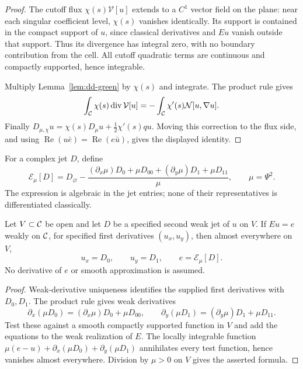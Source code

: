 \begin{proof}
\leanok
The cutoff flux $\chi(s)\mathcal V[u]$ extends to a $C^1$ vector field
on the plane: near each singular coefficient level, $\chi(s)$ vanishes
identically. Its support is contained in the compact support of $u$,
since classical derivatives and $Eu$ vanish outside that support.
Thus its divergence has integral zero, with no boundary contribution
from the cell. All cutoff quadratic terms are continuous and compactly
supported, hence integrable.

Multiply Lemma~\ref{lem:dd-green} by $\chi(s)$ and integrate. The product rule gives
\[
 \int_{\mathcal{C}}\chi(s)\operatorname{div}\mathcal V[u]
 =-\int_{\mathcal{C}}\chi'(s)\mathcal N[u,\nabla u].
\]
Finally
$D_{\mu,\chi}u=\chi(s)D_\mu u+\tfrac12\chi'(s)qu$.
Moving this correction to the flux side, and using
$\operatorname{Re}(u\bar e)=\operatorname{Re}(e\bar u)$,
gives the displayed identity.
\end{proof}

\begin{definition}
\label{def:dd-operator-jet}
\leanok
For a complex jet $D$, define
\[
 \mathcal E_\mu[D]
 =D_\varnothing-\frac{
   (\partial_x\mu)D_0+\mu D_{00}
   +(\partial_y\mu)D_1+\mu D_{11}}{\mu},
 \qquad \mu=\Psi^2.
\]
The expression is algebraic in the jet entries; none of their representatives
is differentiated classically.
\end{definition}

\begin{lemma}
\label{lem:dd-operator-jet}
\leanok
Let $V\subset\mathcal{C}$ be open and let $D$ be a specified second weak jet
of $u$ on $V$. If $Eu=e$ weakly on $\mathcal{C}$, for specified first
derivatives $(u_x,u_y)$, then almost everywhere on $V$,
\[
 u_x=D_0,\qquad u_y=D_1,\qquad e=\mathcal E_\mu[D].
\]
No derivative of $e$ or smooth approximation is assumed.
\end{lemma}

\begin{proof}
\leanok
Weak-derivative uniqueness identifies the supplied first derivatives with
$D_0,D_1$. The product rule gives weak derivatives
\[
 \partial_x(\mu D_0)=(\partial_x\mu)D_0+\mu D_{00},\qquad
 \partial_y(\mu D_1)=(\partial_y\mu)D_1+\mu D_{11}.
\]
Test these against a smooth compactly supported function in $V$ and add
the equations to the weak realization of $E$. The locally integrable function
$\mu(e-u)+\partial_x(\mu D_0)+\partial_y(\mu D_1)$ annihilates every test
function, hence vanishes almost everywhere. Division by $\mu>0$ on $V$
gives the asserted formula.
\end{proof}

